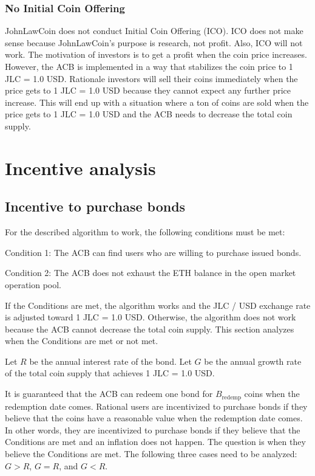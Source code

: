 \documentclass[dvipdfmx,a4paper]{article}
\begin{document}
\subsubsection{No Initial Coin Offering}

JohnLawCoin does not conduct Initial Coin Offering (ICO). ICO does not make sense because JohnLawCoin's purpose is research, not profit. Also, ICO will not work. The motivation of investors is to get a profit when the coin price increases. However, the ACB is implemented in a way that stabilizes the coin price to 1 JLC = 1.0 USD. Rationale investors will sell their coins immediately when the price gets to 1 JLC = 1.0 USD because they cannot expect any further price increase. This will end up with a situation where a ton of coins are sold when the price gets to 1 JLC = 1.0 USD and the ACB needs to decrease the total coin supply.

\section{Incentive analysis}

\subsection{Incentive to purchase bonds}

For the described algorithm to work, the following conditions must be met:

\begin{description}
\item{Condition 1}: The ACB can find users who are willing to purchase issued bonds.
\item{Condition 2}: The ACB does not exhaust the ETH balance in the open market operation pool.
\end{description}

If the Conditions are met, the algorithm works and the JLC / USD exchange rate is adjusted toward 1 JLC = 1.0 USD. Otherwise, the algorithm does not work because the ACB cannot decrease the total coin supply. This section analyzes when the Conditions are met or not met.

Let $R$ be the annual interest rate of the bond. Let $G$ be the annual growth rate of the total coin supply that achieves 1 JLC = 1.0 USD.

It is guaranteed that the ACB can redeem one bond for $B_{\mathrm{redemp}}$ coins when the redemption date comes. Rational users are incentivized to purchase bonds if they believe that the coins have a reasonable value when the redemption date comes. In other words, they are incentivized to purchase bonds if they believe that the Conditions are met and an inflation does not happen. The question is when they believe the Conditions are met. The following three cases need to be analyzed: $G>R$, $G=R$, and $G<R$.
\end{document}
